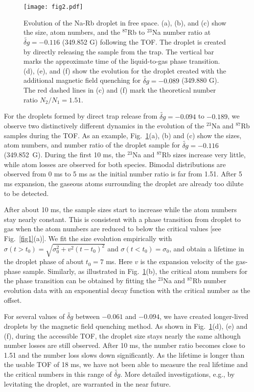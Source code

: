 \begin{figure}[htb]
\begin{center}
\texttt{[image: fig2.pdf]}
\end{center}
\caption{Evolution of the Na-Rb droplet in free space. (a), (b), and (c) show the size, atom numbers, and the $^{87}$Rb to $^{23}$Na number ratio at $\widetilde{\delta g} = -0.116$ (349.852 G) following the TOF. The droplet is created by directly releasing the sample from the trap. The vertical bar marks the approximate time of the liquid-to-gas phase transition. (d), (e), and 
(f) show the evolution for the droplet created with the additional magnetic field quenching for $\widetilde{\delta g} = -0.089$ (349.880 G). The 
red dashed lines in (c) and (f) mark the theoretical number ratio $N_2/N_1=1.51$.  }  \label{fig2}
\end{figure}


For the droplets formed by direct trap release from $\widetilde{\delta g} = -0.094$ to $-0.189$, we observe two distinctively different dynamics in the evolution of the $^{23}$Na and $^{87}$Rb samples during the TOF. As an example, Fig.~\ref{fig2}(a), (b) and (c) show the sizes, atom numbers, and number ratio of the droplet sample for $\widetilde{\delta g}=-0.116$ (349.852~G).
During the first 10 ms, the $^{23}$Na and $^{87}$Rb sizes increase very little, while atom losses are observed for both species.
Bimodal distributions are observed from 0 ms to 5 ms as the initial number ratio is far from 1.51. After 5 ms expansion, the gaseous atoms surrounding the droplet are already too dilute to be detected. 

After about 10 ms, the sample sizes start to increase while the atom numbers stay nearly constant.
This is consistent with a phase transition from droplet to gas when the atom numbers are reduced to below the critical values [see Fig.~\ref{fig1}(a)]. We fit the size evolution empirically with $\sigma(t>t_0)=\sqrt{\sigma_0^2+v^2(t-t_0)^2}$ and $\sigma(t<t_0)=\sigma_0$, and obtain a lifetime in the droplet phase of about $t_0 = 7$ ms. Here $v$ is the expansion velocity of the gas-phase sample. Similarly, as illustrated in Fig.~\ref{fig2}(b), the critical atom numbers for the phase transition can be obtained by fitting the $^{23}$Na and $^{87}$Rb number evolution data with an 
exponential decay function with the critical number as the offset.

For several values of $\widetilde{\delta g}$ between $-0.061$ and $-0.094$, we have created longer-lived droplets by the magnetic field quenching method. As shown in Fig.~\ref{fig2}(d), (e) and (f), during the accessible TOF, the droplet size stays nearly the same although number losses are still observed. After 10 ms, the number ratio becomes close to 1.51 and the number loss slows down significantly. As the lifetime is longer than the usable TOF 
of 18 ms, we have not been able to measure the real lifetime and the critical numbers in this range of $\widetilde{\delta g}$. More detailed investigations, e.g., by levitating the droplet, are warranted in the near future.


